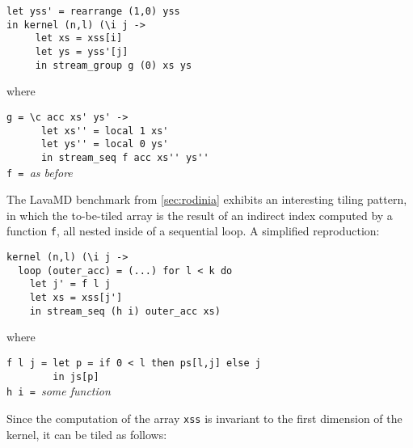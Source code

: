 \begin{lstlisting}[xleftmargin=0.5cm]
let yss' = rearrange (1,0) yss
in kernel (n,l) (\i j ->
     let xs = xss[i]
     let ys = yss'[j]
     in stream_group g (0) xs ys
\end{lstlisting}
\begin{minipage}[t]{0.1\linewidth}
  \begin{flushright}
    where
  \end{flushright}
\end{minipage}
\begin{minipage}[t]{0.8\linewidth}
\lstinline{g = \c acc xs' ys' ->}\\
\lstinline{      let xs'' = local 1 xs'}\\
\lstinline{      let ys'' = local 0 ys'}\\
\lstinline{      in stream_seq f acc xs'' ys''}\\
\lstinline{f = }\textit{as before}
\end{minipage}
\vspace{1em}

The LavaMD benchmark from \cref{sec:rodinia} exhibits an interesting
tiling pattern, in which the to-be-tiled array is the result of an
indirect index computed by a function \texttt{f}, all nested inside of
a sequential loop.  A simplified reproduction:

\begin{lstlisting}[xleftmargin=0.5cm]
kernel (n,l) (\i j ->
  loop (outer_acc) = (...) for l < k do
    let j' = f l j
    let xs = xss[j']
    in stream_seq (h i) outer_acc xs)
\end{lstlisting}
\begin{minipage}[t]{0.1\linewidth}
  \begin{flushright}
    where
  \end{flushright}
\end{minipage}
\begin{minipage}[t]{0.8\linewidth}
\lstinline{f l j = let p = if 0 < l then ps[l,j] else j}\\
\lstinline{        in js[p]}\\
\lstinline{h i = }\textit{some function}
\end{minipage}
\vspace{1em}

Since the computation of the array \texttt{xss} is invariant to the
first dimension of the kernel, it can be tiled as follows:

